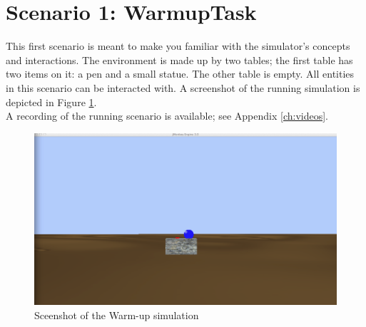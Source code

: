 \section{Scenario 1: WarmupTask} %
\label{sec:eval_warmup_scenario}
This first scenario is meant to make you familiar with the simulator's concepts and interactions. The environment is made up by two tables; the first table has two items on it: a pen and a small statue. The other table is empty. All entities in this scenario can be interacted with. A screenshot of the running simulation is depicted in Figure \ref{fig:eval_warump}.\\

A recording of the running scenario is available; see Appendix \ref{ch:videos}.\\

\begin{figure}[H]
	\centering
	\includegraphics[width=0.8\linewidth]{gfx/Chapter_EvaluationScenarios/prototype1}
	\caption{Sceenshot of the Warm-up simulation}
	\label{fig:eval_warump}
\end{figure}


